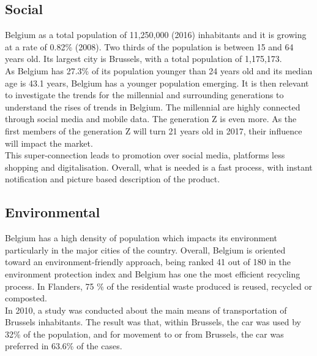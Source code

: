 \documentclass[12pt,a4paper,oneside]{book}
\begin{document}
\subsection{Social}

Belgium as a total population of 11,250,000 (2016) inhabitants and it is growing at a rate of 0.82\% (2008). Two thirds of the population is between 15 and 64 years old. Its largest city is Brussels, with a total population of 1,175,173.\cite{ciafb}\\


As Belgium has 27.3\% of its population younger than 24 years old and its median age is 43.1 years, Belgium has a younger population emerging\cite{ciafb}. It is then relevant to investigate the trends for the millennial and surrounding generations to understand the rises of trends in Belgium. The millennial are highly connected through social media and mobile data. The generation Z is even more. As the first members of the generation Z will turn 21 years old in 2017, their influence will impact the market.\\
This super-connection leads to promotion over social media, platforms less shopping and digitalisation. Overall, what is needed is a fast process, with instant notification and picture based description of the product.\cite{stbe}


\subsection{Environmental}

Belgium has a high density of population which impacts its environment particularly in the major cities of the country. Overall, Belgium is oriented toward an environment-friendly approach, being ranked 41 out of 180 in the environment protection index and Belgium has one the most efficient recycling process.\cite{epi} In Flanders, 75 \% of the residential waste produced is reused, recycled or composted.\cite{wastemana}\\

In 2010, a study was conducted about the main means of transportation of Brussels inhabitants. The result was that, within Brussels, the car was used by 32\% of the population, and for movement to or from Brussels, the car was preferred in 63.6\% of the cases.\cite{mtpd}\\
\end{document}
